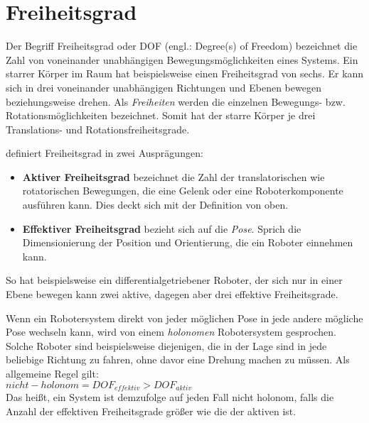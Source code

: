 \section{Freiheitsgrad}
Der Begriff Freiheitsgrad oder DOF (engl.: Degree(s) of Freedom) bezeichnet die Zahl von voneinander unabhängigen Bewegungsmöglichkeiten eines Systems. Ein starrer Körper im Raum hat beispielsweise einen Freiheitsgrad von sechs. Er kann sich in drei voneinander unabhängigen Richtungen und Ebenen bewegen beziehungsweise drehen. Als \textit{Freiheiten} werden die einzelnen Bewegungs- bzw. Rotationsmöglichkeiten bezeichnet. Somit hat der starre Körper je drei Translations- und Rotationsfreiheitsgrade. 

\cite{hertzberg2009mobile} definiert Freiheitsgrad in zwei Ausprägungen: 
\begin{itemize}
\item \textbf{Aktiver Freiheitsgrad} bezeichnet die Zahl der translatorischen wie rotatorischen Bewegungen, die eine Gelenk oder eine Roboterkomponente ausführen kann. Dies deckt sich mit der Definition von oben.
\item \textbf{Effektiver Freiheitsgrad} bezieht sich auf die \textit{Pose}. Sprich die Dimensionierung der Position und Orientierung, die ein Roboter einnehmen kann.
\end{itemize}
So hat beispielsweise ein differentialgetriebener Roboter, der sich nur in einer Ebene bewegen kann zwei aktive, dagegen aber drei effektive Freiheitsgrade.

Wenn ein Robotersystem direkt von jeder möglichen Pose in jede andere mögliche Pose wechseln kann, wird von einem \textit{holonomen} Robotersystem gesprochen. Solche Roboter sind beispielsweise diejenigen, die in der Lage sind in jede beliebige Richtung zu fahren, ohne davor eine Drehung machen zu müssen. Als allgemeine Regel gilt: \\
$ nicht-holonom = DOF_{effektiv} > DOF_{aktiv} $ \\
Das heißt, ein System ist demzufolge auf jeden Fall nicht holonom, falls die Anzahl der effektiven Freiheitsgrade größer wie die der aktiven ist.